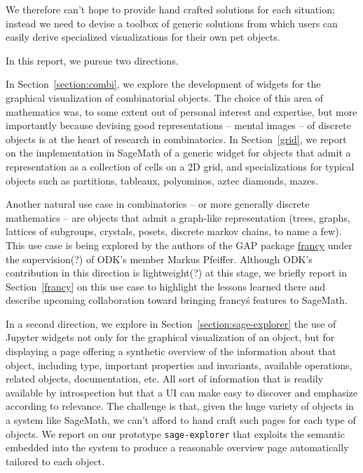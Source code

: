 \documentclass{deliverablereport}
\begin{document}
We therefore can't hope to provide hand crafted solutions for each
situation; instead we need to devise a toolbox of generic solutions
from which users can easily derive specialized visualizations for
their own pet objects.

In this report, we pursue two directions.

In Section~\ref{section:combi}, we explore the development of widgets for the
graphical visualization of combinatorial objects.
The choice of this area of mathematics was, to some extent
out of personal interest and expertise, but more importantly because
devising good representations -- mental images -- of discrete objects
is at the heart of research in combinatorics. In Section~\ref{grid},
we report on the implementation in SageMath of a generic widget for
objects that admit a representation as a collection of cells on a 2D
grid, and specializations for typical objects such as partitions,
tableaux, polyominos, aztec diamonds, mazes.


Another natural use case in combinatorics -- or more generally
discrete mathematics -- are objects that admit a graph-like
representation (trees, graphs, lattices of subgroups, crystals,
posets, discrete markov chains, to name a few). This use case is being
explored by the authors of the GAP package
\href{https://github.com/mcmartins/francy}{francy} under the
supervision(?) of ODK's member Markus Pfeiffer. Although ODK's
contribution in this direction is lightweight(?) at this stage, we
briefly report in Section~\ref{francy} on this use case to highlight
the lessons learned there and describe upcoming collaboration toward
bringing francy\'s features to SageMath.

In a second direction, we explore in
Section~\ref{section:sage-explorer} the use of Jupyter widgets not only
for the graphical visualization of an object, but for displaying a
page offering a synthetic overview of the information about that
object, including type, important properties and invariants, available
operations, related objects, documentation, etc. All sort of
information that is readily available by introspection but that a UI
can make easy to discover and emphasize according to relevance. The
challenge is that, given the huge variety of objects in a system like
SageMath, we can't afford to hand craft such pages for each type of
objects. We report on our prototype
\lstinline{sage-explorer} that exploits the semantic embedded into the
system to produce a reasonable overview page automatically tailored to
each object.
\end{document}
